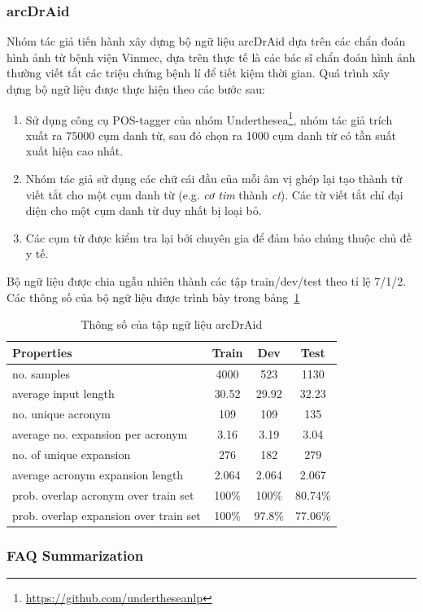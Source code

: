 \subsubsection{arcDrAid}
Nhóm tác giả tiến hành xây dựng bộ ngữ liệu arcDrAid dựa trên các chẩn đoán hình ảnh từ bệnh viện Vinmec, dựa trên thực tế là các bác sĩ chẩn đoán hình ảnh thường viết tắt các triệu chứng bệnh lí để tiết kiệm thời gian. Quá trình xây dựng bộ ngữ liệu được thực hiện theo các bước sau:
\begin{enumerate}
\item Sử dụng công cụ POS-tagger của nhóm Underthesea\footnote{\href{https://github.com/undertheseanlp}{https://github.com/undertheseanlp}}, nhóm tác giả trích xuất ra 75000 cụm danh từ, sau đó chọn ra 1000 cụm danh từ có tần suất xuất hiện cao nhất.
\item Nhóm tác giả sử dụng các chữ cái đầu của mỗi âm vị ghép lại tạo thành từ viết tắt cho một cụm danh từ (e.g. \textit{cơ tim} thành \textit{ct}). Các từ viết tắt chỉ đại diện cho một cụm danh từ duy nhất bị loại bỏ.
\item Các cụm từ được kiểm tra lại bởi chuyên gia để đảm bảo chúng thuộc chủ đề y tế.
\end{enumerate}
Bộ ngữ liệu được chia ngẫu nhiên thành các tập train/dev/test theo tỉ lệ 7/1/2. Các thông số của bộ ngữ liệu được trình bày trong bảng~\ref{tab:arcdraid-stats}
\begin{table}
\centering
\begin{tabular}{|p{3.75cm}|c|c|c|}
\hline
\textbf{Properties} & \textbf{Train} & \textbf{Dev} & \textbf{Test} \\ \hline
no. samples & 4000 & 523 & 1130 \\ \hline
average input length & 30.52 & 29.92 & 32.23 \\ \hline
no. unique acronym & 109 & 109 & 135 \\ \hline
average no. expansion per acronym & 3.16 & 3.19 & 3.04 \\ \hline
no. of unique expansion & 276 & 182 & 279 \\ \hline
average acronym expansion length & 2.064 & 2.064 & 2.067 \\ \hline
prob. overlap acronym over train set & 100\% & 100\% & 80.74\% \\ \hline
prob. overlap expansion over train set & 100\% & 97.8\% & 77.06\% \\ \hline
\end{tabular}
\caption{Thông số của tập ngữ liệu arcDrAid\cite{minh-EtAl:2022:LREC}}
\label{tab:arcdraid-stats}
\end{table}

\subsubsection{FAQ Summarization}